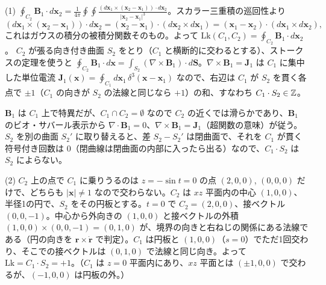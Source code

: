 \begin{solution}
(1) $\oint_{C_2}\bm B_1\cdot d\bm x_2=\frac1{4\pi}\oint\oint\frac{(d\bm x_1\times(\bm x_2-\bm x_1))\cdot d\bm x_2}{\lvert\bm x_2-\bm x_1\rvert^3}$。スカラー三重積の巡回性より
\[
(d\bm x_1\times(\bm x_2-\bm x_1))\cdot d\bm x_2=(\bm x_2-\bm x_1)\cdot(d\bm x_2\times d\bm x_1)=(\bm x_1-\bm x_2)\cdot(d\bm x_1\times d\bm x_2),
\]
これはガウスの積分の被積分関数そのもの。よって $\mathrm{Lk}(C_1,C_2)=\oint_{C_2}\bm B_1\cdot d\bm x_2$。
$C_2$ が張る向き付き曲面 $S_2$ をとり（$C_1$ と横断的に交わるとする）、ストークスの定理を使うと $\oint_{C_2}\bm B_1\cdot d\bm x=\int_{S_2}(\nabla\times\bm B_1)\cdot d\bm S$。$\nabla\times\bm B_1=\bm J_1$ は $C_1$ に集中した単位電流 $\bm J_1(\bm x)=\oint_{C_1}d\bm x_1\,\delta^3(\bm x-\bm x_1)$ なので、右辺は $C_1$ が $S_2$ を貫く各点で $\pm1$（$C_1$ の向きが $S_2$ の法線と同じなら $+1$）の和、すなわち $C_1\cdot S_2\in\mathbb{Z}$。
\begin{note}
$\bm B_1$ は $C_1$ 上で特異だが、$C_1\cap C_2=\emptyset$ なので $C_2$ の近くでは滑らかであり、$\bm B_1$ のビオ・サバール表示から $\nabla\cdot\bm B_1=0$、$\nabla\times\bm B_1=\bm J_1$（超関数の意味）が従う。$S_2$ を別の曲面 $S_2'$ に取り替えると、差 $S_2-S_2'$ は閉曲面で、それを $C_1$ が貫く符号付き回数は $0$（閉曲線は閉曲面の内部に入ったら出る）なので、$C_1\cdot S_2$ は $S_2$ によらない。
\end{note}

(2) $C_2$ 上の点で $C_1$ に乗りうるのは $z=-\sin t=0$ の点 $(2,0,0)$, $(0,0,0)$ だけで、どちらも $\lvert\bm x\rvert\neq1$ なので交わらない。$C_2$ は $xz$ 平面内の中心 $(1,0,0)$、半径1の円で、$S_2$ をその円板とする。$t=0$ で $C_2=(2,0,0)$、接ベクトル $(0,0,-1)$。中心から外向きの $(1,0,0)$ と接ベクトルの外積 $(1,0,0)\times(0,0,-1)=(0,1,0)$ が、境界の向きと右ねじの関係にある法線である（円の向きを $\bm r\times\dot{\bm r}$ で判定）。$C_1$ は円板と $(1,0,0)$（$s=0$）でただ1回交わり、そこでの接ベクトルは $(0,1,0)$ で法線と同じ向き。よって $\mathrm{Lk}=C_1\cdot S_2=+1$。（$C_1$ は $z=0$ 平面内にあり、$xz$ 平面とは $(\pm1,0,0)$ で交わるが、$(-1,0,0)$ は円板の外。）


\end{solution}
